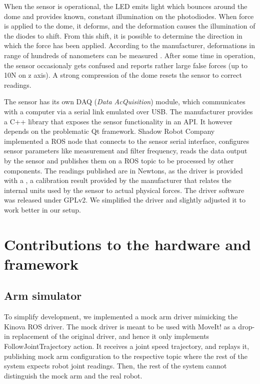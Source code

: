 \documentclass[buriama8_dp.tex]{subfiles}
\begin{document}
When the sensor is operational, the LED emits light which bounces around the dome and provides known, constant illumination on the photodiodes. When force is applied to the dome, it deforms, and the deformation causes the illumination of the diodes to shift. From this shift, it is possible to determine the direction in which the force has been applied. According to the manufacturer, deformations in range of hundreds of nanometers can be measured \cite{opto_whitep}. After some time in operation, the sensor occasionaly gets confused and reports rather large false forces (up to 10N on z axis). A strong compression of the dome resets the sensor to correct readings.

The sensor has its own DAQ (\emph{Data AcQuisition}) module, which communicates with a computer via a serial link emulated over USB. The manufacturer provides a C++ library that exposes the sensor functionality in an API. It however depends on the problematic Qt framework. Shadow Robot Company \cite{opto_driver}  implemented a ROS node that connects to the sensor serial interface, configures sensor parameters like measurement and filter frequency, reads the data output by the sensor and publishes them on a ROS topic to be processed by other components. The readings published are in Newtons, as the driver is provided with a , a calibration result provided by the manufacturer that relates the internal units used by the sensor to actual physical forces. The driver software was released under GPLv2. We simplified the driver and slightly adjusted it to work better in our setup.


\section{Contributions to the hardware and framework}
\label{sec:hw_contrib}

\subsection{Arm simulator}
\label{subsec:arm_sim}

To simplify development, we implemented a mock arm driver mimicking the Kinova ROS driver. The mock driver is meant to be used with MoveIt! as a drop-in replacement of the original driver, and hence it only implements FollowJointTrajectory action. It receives a joint speed trajectory, and replays it, publishing mock arm configuration to the respective topic where the rest of the system expects robot joint readings. Then, the rest of the system cannot distinguish the mock arm and the real robot.
\end{document}
